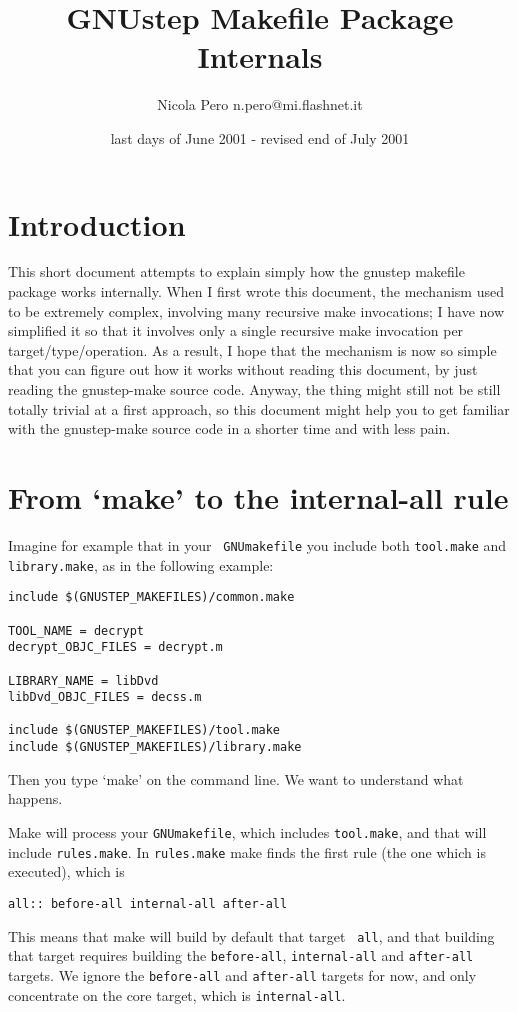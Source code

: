 \documentclass[a4paper]{article}
\begin{document}
\title{GNUstep Makefile Package Internals}
\author{Nicola Pero n.pero@mi.flashnet.it}
\date{last days of June 2001 - revised end of July 2001}
\maketitle
\tableofcontents

\section{Introduction}
This short document attempts to explain simply how the gnustep
makefile package works internally.  When I first wrote this document,
the mechanism used to be extremely complex, involving many recursive
make invocations; I have now simplified it so that it involves only a
single recursive make invocation per target/type/operation.  As a
result, I hope that the mechanism is now so simple that you can figure
out how it works without reading this document, by just reading the
gnustep-make source code.  Anyway, the thing might still not be still
totally trivial at a first approach, so this document might help you
to get familiar with the gnustep-make source code in a shorter time
and with less pain.

\section{From `make' to the internal-all rule}
Imagine for example that in your \texttt{ GNUmakefile} you include both
\texttt{tool.make} and \texttt{library.make}, as in the following example:
\begin{verbatim}
include $(GNUSTEP_MAKEFILES)/common.make

TOOL_NAME = decrypt
decrypt_OBJC_FILES = decrypt.m

LIBRARY_NAME = libDvd
libDvd_OBJC_FILES = decss.m

include $(GNUSTEP_MAKEFILES)/tool.make
include $(GNUSTEP_MAKEFILES)/library.make
\end{verbatim} %
Then you type `make' on the command line.  We want to understand what
happens.

Make will process your \texttt{GNUmakefile}, which includes
\texttt{tool.make}, and that will include \texttt{rules.make}.  In
\texttt{rules.make} make finds the first rule (the one which is
executed), which is
\begin{verbatim}
all:: before-all internal-all after-all
\end{verbatim}
This means that make will build by default that target \texttt{ all},
and that building that target requires building the
\texttt{before-all}, \texttt{internal-all} and \texttt{after-all}
targets.  We ignore the \texttt{before-all} and \texttt{after-all}
targets for now, and only concentrate on the core target, which is
\texttt{internal-all}.
\end{document}
